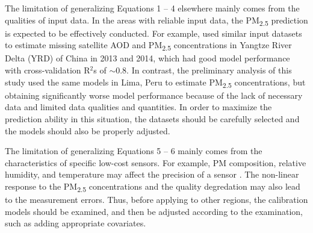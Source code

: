 \documentclass[11pt]{article}
\newcommand{\tsub}{\textsubscript}
\begin{document}
\begin{enumerate*}[{[a)]}]
    \item The limitation of generalizing Equations 1 -- 4 elsewhere mainly comes from the qualities of input data. In the areas with reliable input data, the PM\tsub{2.5} prediction is expected to be effectively conducted. For example, \citet{xiao2017full} used similar input datasets to estimate missing satellite AOD and PM\tsub{2.5} concentrations in Yangtze River Delta (YRD) of China in 2013 and 2014, which had good model performance with cross-validation R$^2$s of $\sim$0.8. In contrast, the preliminary analysis of this study used the same models in Lima, Peru to estimate PM\tsub{2.5} concentrations, but obtaining significantly worse model performance because of the lack of necessary data and limited data qualities and quantities. In order to maximize the prediction ability in this situation, the datasets should be carefully selected and the models should also be properly adjusted.
    
    The limitation of generalizing Equations 5 -- 6 mainly comes from the characteristics of specific low-cost sensors. For example, PM composition, relative humidity, and temperature may affect the precision of a sensor \citep{carvlin2017development, broday2017wireless, castell2017can}. The non-linear response to the PM\tsub{2.5} concentrations \citep{kelly2017ambient} and the quality degredation \citep{broday2017wireless} may also lead to the measurement errors. Thus, before applying to other regions, the calibration models should be examined, and then be adjusted according to the examination, such as adding appropriate covariates. 
\end{enumerate*}
\end{document}
